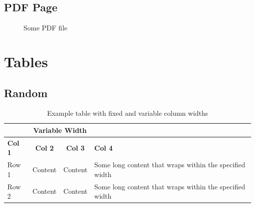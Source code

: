 \documentclass{scrartcl}
\begin{document}
    \FloatBarrier
    \noindent

\newpage
\subsection{PDF Page}
\begin{figure}[ht]
    
    \caption{Some PDF file}
    \label{fig:Tangrami}
\end{figure}
\FloatBarrier
\noindent
\newpage

\section{Tables}
\subsection{Random}
\noindent
\FloatBarrier
\begin{table}[htbp]
    \centering
    \caption{Example table with fixed and variable column widths}
    \begin{tabular}{|>{\centering\arraybackslash}p{2cm}|c|c|p{3cm}|}
        \hline
        \multicolumn{2}{|c|}{\textbf{Fixed Width}} & \multicolumn{2}{c|}{\textbf{Variable Width}} \\
        \hline
        \textbf{Col 1} & \textbf{Col 2} & \textbf{Col 3} & \textbf{Col 4} \\
        \hline
        Row 1 & Content & Content & Some long content that wraps within the specified width \\
        \hline
        Row 2 & Content & Content & Some long content that wraps within the specified width \\
        \hline
    \end{tabular}
    \label{tab:example}
\end{table}
\FloatBarrier
\end{document}
